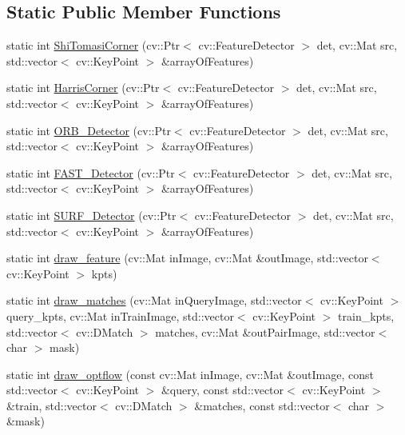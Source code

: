 \subsection*{\-Static \-Public \-Member \-Functions}
\begin{DoxyCompactItemize}
\item 
static int \hyperlink{classLRM_1_1ImageProcessor_a8a8deb80b7824c5f0946acf1ff9df73e}{\-Shi\-Tomasi\-Corner} (cv\-::\-Ptr$<$ cv\-::\-Feature\-Detector $>$ det, cv\-::\-Mat src, std\-::vector$<$ cv\-::\-Key\-Point $>$ \&array\-Of\-Features)
\item 
static int \hyperlink{classLRM_1_1ImageProcessor_ad7f3dcefc1fb5f4f012203d37208fabe}{\-Harris\-Corner} (cv\-::\-Ptr$<$ cv\-::\-Feature\-Detector $>$ det, cv\-::\-Mat src, std\-::vector$<$ cv\-::\-Key\-Point $>$ \&array\-Of\-Features)
\item 
static int \hyperlink{classLRM_1_1ImageProcessor_a36f20a03dd7322d66bc6bc30f93bbb0a}{\-O\-R\-B\-\_\-\-Detector} (cv\-::\-Ptr$<$ cv\-::\-Feature\-Detector $>$ det, cv\-::\-Mat src, std\-::vector$<$ cv\-::\-Key\-Point $>$ \&array\-Of\-Features)
\item 
static int \hyperlink{classLRM_1_1ImageProcessor_a98a2f239eb9376398846b8cafc3c2b43}{\-F\-A\-S\-T\-\_\-\-Detector} (cv\-::\-Ptr$<$ cv\-::\-Feature\-Detector $>$ det, cv\-::\-Mat src, std\-::vector$<$ cv\-::\-Key\-Point $>$ \&array\-Of\-Features)
\item 
static int \hyperlink{classLRM_1_1ImageProcessor_a175b94a0ed60b83d2b7687958d81193e}{\-S\-U\-R\-F\-\_\-\-Detector} (cv\-::\-Ptr$<$ cv\-::\-Feature\-Detector $>$ det, cv\-::\-Mat src, std\-::vector$<$ cv\-::\-Key\-Point $>$ \&array\-Of\-Features)
\item 
static int \hyperlink{classLRM_1_1ImageProcessor_a54467c3da8a338bac8f89c4d7f7a4dc2}{draw\-\_\-feature} (cv\-::\-Mat in\-Image, cv\-::\-Mat \&out\-Image, std\-::vector$<$ cv\-::\-Key\-Point $>$ kpts)
\item 
static int \hyperlink{classLRM_1_1ImageProcessor_a4c6bffe3c04f2580a49399bf9a285d9d}{draw\-\_\-matches} (cv\-::\-Mat in\-Query\-Image, std\-::vector$<$ cv\-::\-Key\-Point $>$ query\-\_\-kpts, cv\-::\-Mat in\-Train\-Image, std\-::vector$<$ cv\-::\-Key\-Point $>$ train\-\_\-kpts, std\-::vector$<$ cv\-::\-D\-Match $>$ matches, cv\-::\-Mat \&out\-Pair\-Image, std\-::vector$<$ char $>$ mask)
\item 
static int \hyperlink{classLRM_1_1ImageProcessor_a23b4e5f58559a566cf15b204acf0aa22}{draw\-\_\-optflow} (const cv\-::\-Mat in\-Image, cv\-::\-Mat \&out\-Image, const std\-::vector$<$ cv\-::\-Key\-Point $>$ \&query, const std\-::vector$<$ cv\-::\-Key\-Point $>$ \&train, std\-::vector$<$ cv\-::\-D\-Match $>$ \&matches, const std\-::vector$<$ char $>$ \&mask)
\end{DoxyCompactItemize}
